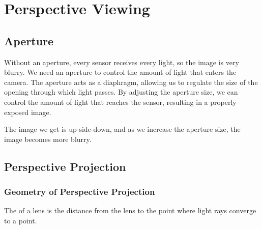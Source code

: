 \section{Perspective Viewing}

\subsection{Aperture}

Without an aperture, every sensor receives every light, so the image is very blurry. We need an aperture to control the amount of light that enters the camera. The aperture acts as a diaphragm, allowing us to regulate the size of the opening through which light passes. By adjusting the aperture size, we can control the amount of light that reaches the sensor, resulting in a properly exposed image. 

The image we get is up-side-down, and as we increase the aperture size, the image becomes more blurry. 

\subsection{Perspective Projection}

\subsubsection{Geometry of Perspective Projection}

\begin{definition}
    The  of a lens is the distance from the lens to the point where light rays converge to a point.
\end{definition}

\begin{figure}[ht!]
    \centering
\end{figure}

